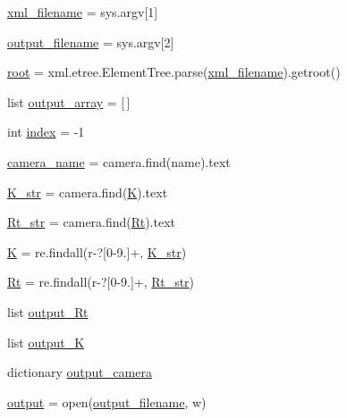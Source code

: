 \begin{DoxyCompactItemize}
\item 
\hyperlink{namespaceimport__xml_aaf3ac984b3bbe9ea024af43d503eb08d}{xml\+\_\+filename} = sys.\+argv\mbox{[}1\mbox{]}
\item 
\hyperlink{namespaceimport__xml_a307ad9a3391d6a9cb512087355ad9a0b}{output\+\_\+filename} = sys.\+argv\mbox{[}2\mbox{]}
\item 
\hyperlink{namespaceimport__xml_a9ddb8ad46de8d0512c0c33ecc57e3dc8}{root} = xml.\+etree.\+Element\+Tree.\+parse(\hyperlink{namespaceimport__xml_aaf3ac984b3bbe9ea024af43d503eb08d}{xml\+\_\+filename}).getroot()
\item 
list \hyperlink{namespaceimport__xml_acbf94a80402f1f3bc6edfcb26847857e}{output\+\_\+array} = \mbox{[}$\,$\mbox{]}
\item 
int \hyperlink{namespaceimport__xml_a6647320ea7243e814d6b6e5467401cb5}{index} = -\/1
\item 
\hyperlink{namespaceimport__xml_a62e884f4d6cb5ffb7aa2d54b47326879}{camera\+\_\+name} = camera.\+find(\textquotesingle{}name\textquotesingle{}).text
\item 
\hyperlink{namespaceimport__xml_afadf173b7511d8dc7f7421e25b7e5fe0}{K\+\_\+str} = camera.\+find(\textquotesingle{}\hyperlink{namespaceimport__xml_a114c9dbaec4f1a19d322303b9f40754e}{K}\textquotesingle{}).text
\item 
\hyperlink{namespaceimport__xml_ae9bd125b10e08d1149b3c7ca82baa85f}{Rt\+\_\+str} = camera.\+find(\textquotesingle{}\hyperlink{namespaceimport__xml_a8ee934fa632e40193dea858cced805a1}{Rt}\textquotesingle{}).text
\item 
\hyperlink{namespaceimport__xml_a114c9dbaec4f1a19d322303b9f40754e}{K} = re.\+findall(r\textquotesingle{}-\/?\mbox{[}0-\/9.\mbox{]}+\textquotesingle{}, \hyperlink{namespaceimport__xml_afadf173b7511d8dc7f7421e25b7e5fe0}{K\+\_\+str})
\item 
\hyperlink{namespaceimport__xml_a8ee934fa632e40193dea858cced805a1}{Rt} = re.\+findall(r\textquotesingle{}-\/?\mbox{[}0-\/9.\mbox{]}+\textquotesingle{}, \hyperlink{namespaceimport__xml_ae9bd125b10e08d1149b3c7ca82baa85f}{Rt\+\_\+str})
\item 
list \hyperlink{namespaceimport__xml_ab25ba10cad6227b6b27a86882644dbce}{output\+\_\+\+Rt}
\item 
list \hyperlink{namespaceimport__xml_a1993df83e9785cc32d460d46661f5ca7}{output\+\_\+K}
\item 
dictionary \hyperlink{namespaceimport__xml_a0efcba25cb78bff3cebf1a0d5e9e7818}{output\+\_\+camera}
\item 
\hyperlink{namespaceimport__xml_a03cb3f12d1861aaa30d97d1e6ba45c9e}{output} = open(\hyperlink{namespaceimport__xml_a307ad9a3391d6a9cb512087355ad9a0b}{output\+\_\+filename}, \textquotesingle{}w\textquotesingle{})
\end{DoxyCompactItemize}


